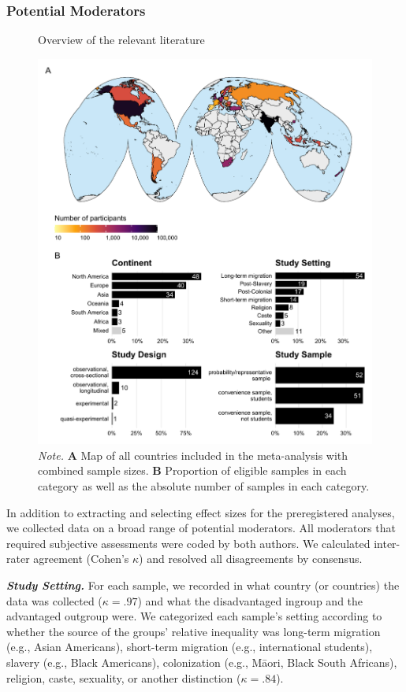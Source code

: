 \documentclass[twocolumn, 11pt, letterpaper]{article}
\begin{document}
\hypertarget{potential-moderators}{%
\subsubsection{Potential Moderators}\label{potential-moderators}}

\begin{figure}
\centering
\caption{Overview of the relevant literature}
\includegraphics[scale=1]{../figures/figure-2}
\caption*{\textit{Note.} \textbf{A} Map of all countries included in the meta-analysis with combined sample sizes. \textbf{B} Proportion of eligible samples in each category as well as the absolute number of samples in each category.}
\label{fig:f2}
\end{figure}

In addition to extracting and selecting effect sizes for the
preregistered analyses, we collected data on a broad range of potential
moderators. All moderators that required subjective assessments were
coded by both authors. We calculated inter-rater agreement (Cohen's
\(\kappa\)) and resolved all disagreements by consensus.

\textbf{\emph{Study Setting.}} For each sample, we recorded in what
country (or countries) the data was collected (\(\kappa = .97\)) and
what the disadvantaged ingroup and the advantaged outgroup were. We
categorized each sample's setting according to whether the source of the
groups' relative inequality was long-term migration (e.g., Asian
Americans), short-term migration (e.g., international students), slavery
(e.g., Black Americans), colonization (e.g., Māori, Black South
Africans), religion, caste, sexuality, or another distinction
(\(\kappa = .84\)).
\end{document}
